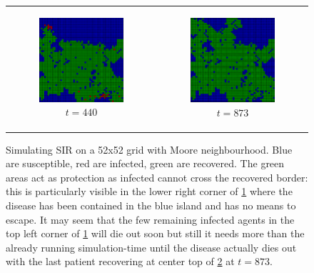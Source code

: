 \begin{figure}
\begin{center}
\begin{tabular}{c c}
		\begin{subfigure}[b]{0.4\textwidth}
			\centering
			\includegraphics[width=.6\textwidth, angle=0]{./../shared/fig/SIR_spatial_52x52_440time.png}
			\caption{$t = 440$}
			\label{fig:sir_spatial_440}
		\end{subfigure}
		
		& 
		
		\begin{subfigure}[b]{0.4\textwidth}
			\centering
			\includegraphics[width=.6\textwidth, angle=0]{./../shared/fig/SIR_spatial_52x52_873time.png}
			\caption{$t = 873$}
			\label{fig:sir_spatial_873}
		\end{subfigure}
	\end{tabular}
	
	\caption{Simulating SIR on a 52x52 grid with Moore neighbourhood. Blue are susceptible, red are infected, green are recovered. The green areas act as protection as infected cannot cross the recovered border: this is particularly visible in the lower right corner of \ref{fig:sir_spatial_440} where the disease has been contained in the blue island and has no means to escape. It may seem that the few remaining infected agents in the top left corner of \ref{fig:sir_spatial_440} will die out soon but still it needs more than the already running simulation-time until the disease actually dies out with the last patient recovering at center top of \ref{fig:sir_spatial_873} at $t = 873$.} 
	\label{fig:sir_spatial}
\end{center}
\end{figure}

